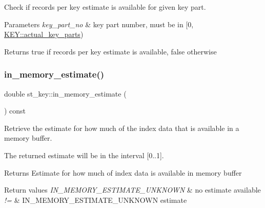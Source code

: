 Check if records per key estimate is available for given key part.


\begin{DoxyParams}{Parameters}
{\em key\+\_\+part\+\_\+no} & key part number, must be in \mbox{[}0, \mbox{\hyperlink{structst__key_ae6e21b5421c8c6f5a53fc5ec3dbeea80}{K\+E\+Y\+::actual\+\_\+key\+\_\+parts}})\\
\hline
\end{DoxyParams}
\begin{DoxyReturn}{Returns}
true if records per key estimate is available, false otherwise 
\end{DoxyReturn}
\mbox{\label{structst__key_ae2a5ab21c66d08495387149a0206b0be}} 
\subsubsection{\texorpdfstring{in\+\_\+memory\+\_\+estimate()}{in\_memory\_estimate()}}
{\footnotesize\ttfamily double st\+\_\+key\+::in\+\_\+memory\+\_\+estimate (\begin{DoxyParamCaption}{ }\end{DoxyParamCaption}) const\hspace{0.3cm}{\ttfamily [inline]}}

Retrieve the estimate for how much of the index data that is available in a memory buffer.

The returned estimate will be in the interval \mbox{[}0..1\mbox{]}.

\begin{DoxyReturn}{Returns}
Estimate for how much of index data is available in memory buffer 
\end{DoxyReturn}

\begin{DoxyRetVals}{Return values}
{\em I\+N\+\_\+\+M\+E\+M\+O\+R\+Y\+\_\+\+E\+S\+T\+I\+M\+A\+T\+E\+\_\+\+U\+N\+K\+N\+O\+WN} & no estimate available \\
\hline
{\em !=} & I\+N\+\_\+\+M\+E\+M\+O\+R\+Y\+\_\+\+E\+S\+T\+I\+M\+A\+T\+E\+\_\+\+U\+N\+K\+N\+O\+WN estimate \\
\hline
\end{DoxyRetVals}
\mbox{\label{structst__key_a74a67a852132dc677396f5e446d2d67a}} 
